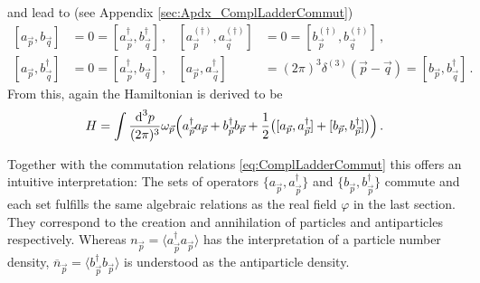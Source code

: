 and lead to (see Appendix \ref{sec:Apdx_ComplLadderCommut})
\begin{equation}
    \begin{aligned}
        [a_{\vec{p}},b_{\vec{q}}]&=0=[a_{\vec{p}}^\dagger,b_{\vec{q}}^\dagger]\,,&[a_{\vec{p}}^{(\dagger)},a_{\vec{q}}^{(\dagger)}]&=0=[b_{\vec{p}}^{(\dagger)},b_{\vec{q}}^{(\dagger)}]\,,\\
        [a_{\vec{p}},b_{\vec{q}}^\dagger]&=0=[a_{\vec{p}}^\dagger,b_{\vec{q}}]\,,&[a_{\vec{p}},a_{\vec{q}}^\dagger]&=(2\pi)^3\delta^{(3)}(\vec{p}-\vec{q})=[b_{\vec{p}},b_{\vec{q}}^\dagger]\,.
    \end{aligned}
    \label{eq:ComplLadderCommut}
\end{equation}
From this, again the Hamiltonian is derived to be
\begin{equation}      
        H=\int\frac{\text{d}^3p}{(2\pi)^3}\omega_{\vec{p}}\Big(a_{\vec{p}}^\dagger a_{\vec{p}}+b_{\vec{p}}^\dagger b_{\vec{p}}+\frac{1}{2}\big([a_{\vec{p}},a_{\vec{p}}^\dagger]+[b_{\vec{p}},b_{\vec{p}}^\dagger]\big)\Big)\,.
\end{equation}

Together with the commutation relations \eqref{eq:ComplLadderCommut} this offers an intuitive interpretation: The sets of operators ${\{a_{\vec{p}},a_{\vec{p}}^\dagger\}}$ and ${\{b_{\vec{p}},b_{\vec{p}}^\dagger\}}$ commute and each set fulfills the same algebraic relations as the real field $\varphi$ in the last section. They correspond to the creation and annihilation of particles and antiparticles respectively. Whereas ${n_{\vec{p}}=\langle a_{\vec{p}}^\dagger a_{\vec{p}}\rangle}$ has the interpretation of a particle number density, ${\overline{n}_{\vec{p}}=\langle b_{\vec{p}}^\dagger b_{\vec{p}}\rangle}$ is understood as the antiparticle density.




